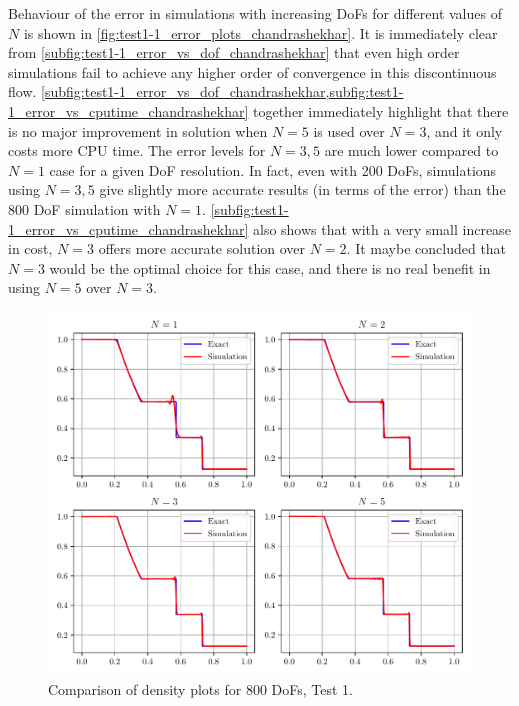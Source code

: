 \documentclass[a4paper,11pt,oneside]{article}
\begin{document}
Behaviour of the error in simulations with increasing DoFs for different values of $N$ is shown in \cref{fig:test1-1_error_plots_chandrashekhar}. It is immediately clear from \cref{subfig:test1-1_error_vs_dof_chandrashekhar} that even high order simulations fail to achieve any higher order of convergence in this discontinuous flow. \cref{subfig:test1-1_error_vs_dof_chandrashekhar,subfig:test1-1_error_vs_cputime_chandrashekhar} together immediately highlight that there is no major improvement in solution when $N=5$ is used over $N=3$, and it only costs more CPU time. The error levels for $N=3,5$ are much lower compared to $N=1$ case for a given DoF resolution. In fact, even with 200 DoFs, simulations using $N=3,5$ give slightly more accurate results (in terms of the error) than the 800 DoF simulation with $N=1$. \cref{subfig:test1-1_error_vs_cputime_chandrashekhar} also shows that with a very small increase in cost, $N=3$ offers more accurate solution over $N=2$. It maybe concluded that $N=3$ would be the optimal choice for this case, and there is no real benefit in using $N=5$ over $N=3$.

\begin{figure}[htbp]
	\includegraphics[width=\linewidth]{figures/riemann_1d/test1-1/dof800_12_12_chandrashekhar.pdf}
	\caption{Comparison of density plots for 800 DoFs, Test 1.}
	\label{fig:test1-1_dof800_chandrashekhar}
\end{figure}
\end{document}
